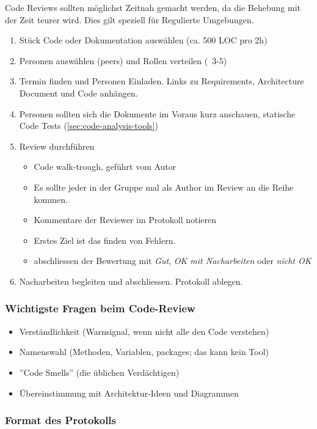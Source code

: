 Code Reviews sollten möglichst Zeitnah gemacht werden, da die Behebung mit der Zeit teurer wird. Dies gilt speziell für Regulierte Umgebungen.

\begin{enumerate}
	\item Stück Code oder Dokumentation auswählen (ca. 500 LOC pro 2h)
	\item Personen auswählen (peers) und Rollen verteilen (~3-5)
	\item Termin finden und Personen Einladen. Links zu Requirements, Architecture Document und Code anhängen.
	\item Personen sollten sich die Dokumente im Voraus kurz anschauen, statische Code Tests (\ref{sec:code-analysis-tools})
	\item Review durchführen \begin{itemize}
		\item Code walk-trough, geführt vom Autor
		\item Es sollte jeder in der Gruppe mal als Author im Review an die Reihe kommen.
		\item Kommentare der Reviewer im Protokoll notieren
		\item Erstes Ziel ist das finden von Fehlern.
		\item abschliessen der Bewertung mit \emph{Gut}, \emph{OK mit Nacharbeiten} oder \emph{nicht OK}
	\end{itemize}
	\item Nacharbeiten begleiten und abschliessen. Protokoll ablegen.
\end{enumerate}

\subsubsection{Wichtigste Fragen beim Code-Review}

\begin{itemize}
	\item Verständlichkeit (Warnsignal, wenn nicht alle den Code verstehen)
	\item Namenswahl (Methoden, Variablen, packages; das kann kein Tool)
	\item ''Code Smells'' (die üblichen Verdächtigen)
	\item Übereinstimmung mit Architektur-Ideen und Diagrammen
\end{itemize}

\subsubsection{Format des Protokolls}

